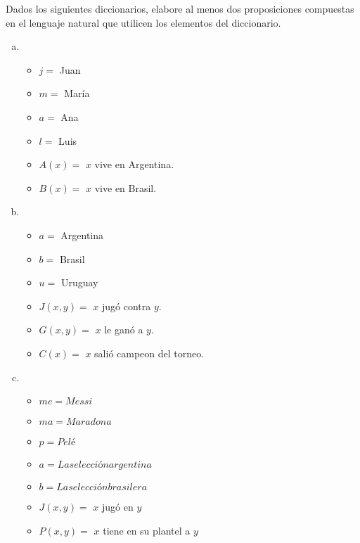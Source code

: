 \begin{exercise}
    Dados los siguientes diccionarios, elabore al menos dos proposiciones compuestas en el lenguaje natural que utilicen los elementos del diccionario.

    \begin{enumerate}[a)]
    \item
        \begin{itemize}[label=, leftmargin=0mm,itemsep=8pt]
            \item $j = $ Juan
            \item $m = $ María
            \item $a = $ Ana
            \item $l = $ Luis
            \item $A(x) = $ $x$ vive en Argentina.
            \item $B(x) = $ $x$ vive en Brasil.
        \end{itemize}
    \item
        \begin{itemize}[label=, leftmargin=0mm,itemsep=8pt]
            \item $a = $  Argentina
            \item $b = $  Brasil
            \item $u = $  Uruguay
            \item $J(x, y) = $ $x$ jugó contra $y$.
            \item $G(x, y) = $ $x$ le ganó a $y$.
            \item $C(x) = $ $x$ salió campeon del torneo.
        \end{itemize}
    \item
        \begin{itemize}[label=, leftmargin=0mm,itemsep=8pt]
            \item $me = Messi$
            \item $ma = Maradona$
            \item $p = Pelé$
            \item $a = La selección argentina$
            \item $b = La selección brasilera$
            \item $J(x, y) = $ $x$ jugó en $y$
            \item $P(x, y) = $ $x$ tiene en su plantel a $y$
        \end{itemize}
    \end{enumerate}
\end{exercise}

